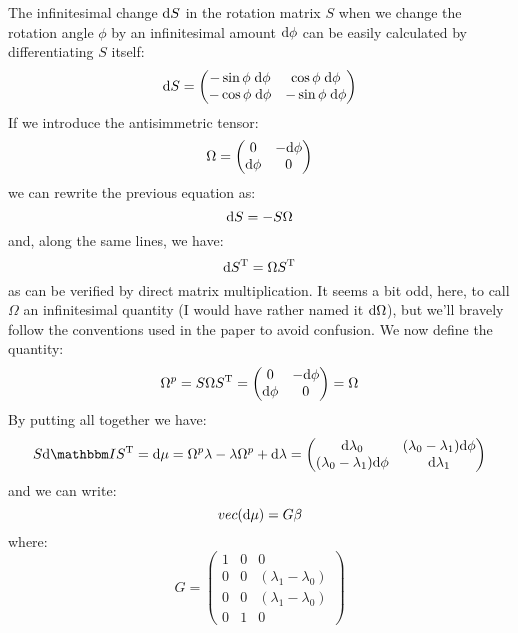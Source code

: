 \documentclass[a4paper,11pt]{article}
\newcommand{\itm}{\mathbbm I}
\newcommand{\diff}{{\rm d}}
\begin{document}
The infinitesimal change $\diff S$ in the rotation matrix $S$ when we change
the rotation angle $\phi$ by an infinitesimal amount $\diff\phi$ can be easily
calculated by differentiating $S$ itself:
$$
\diff S =
\begin{pmatrix}
  -\sin\phi\;\diff\phi & \cos\phi\;\diff\phi\\
  -\cos\phi\;\diff\phi & -\sin\phi\;\diff\phi\\
\end{pmatrix}
$$
If we introduce the antisimmetric tensor:
\begin{equation}
  \Omega = 
  \begin{pmatrix}
    0 & -\diff\phi\\
    \diff\phi & 0
  \end{pmatrix}
\end{equation}
we can rewrite the previous equation as:
\begin{equation}
  \diff S = -S\Omega
\end{equation}
and, along the same lines, we have:
\begin{equation}
  \diff S^{\rm T} = \Omega S^{\rm T}
\end{equation}
as can be verified by direct matrix multiplication. It seems a bit odd, here,
to call $\Omega$ an infinitesimal quantity (I would have rather named it
$\diff\Omega$), but we'll bravely follow the conventions used in the paper to
avoid confusion.
We now define the quantity:
\begin{equation}
  \Omega^p = S\Omega S^{\rm T} =
\begin{pmatrix}
  0 & -\diff\phi\\
  \diff\phi & 0\\
\end{pmatrix} = \Omega
\end{equation}
By putting all together we have:
\begin{equation}
  S \diff \itm S^{\rm T} = \diff\mu =
  \Omega^p\lambda - \lambda\Omega^p + \diff\lambda = 
  \begin{pmatrix}
    \diff\lambda_0 & (\lambda_0 - \lambda_1)\diff\phi\\
    (\lambda_0 - \lambda_1)\diff\phi & \diff\lambda_1
  \end{pmatrix}
\end{equation}
and we can write:
\begin{equation}
  vec(\diff\mu) = G\beta
\end{equation}
where:
\begin{equation}
  G =
  \begin{pmatrix}
    1 & 0 & 0\\
    0 & 0 & (\lambda_1 - \lambda_0)\\
    0 & 0 & (\lambda_1 - \lambda_0)\\
    0 & 1 & 0
  \end{pmatrix}
\end{equation}
\end{document}
